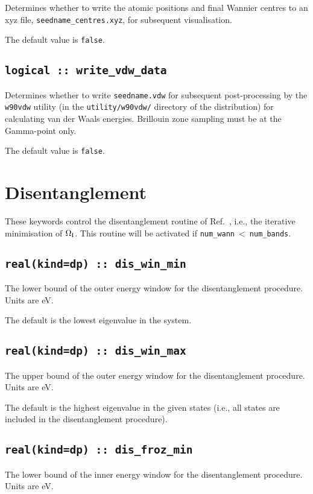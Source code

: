 Determines whether to write the atomic positions and
final Wannier centres to an xyz file,
\verb#seedname_centres.xyz#, for subsequent
visualisation.

The default value is \verb#false#.

\subsection[write\_vdw\_data]{\tt logical :: write\_vdw\_data}

Determines whether to write \verb#seedname.vdw# for
subsequent post-processing by the \verb#w90vdw# utility
(in the \verb#utility/w90vdw/# directory of the
distribution) for calculating van der Waals energies.
Brillouin zone sampling must be at the Gamma-point only.

The default value is \verb#false#.


\section{Disentanglement}
These keywords control the disentanglement routine of
Ref.~\cite{souza-prb01}, i.e., the iterative minimisation of $\Omega_{\mathrm{I}}$. This
routine will be activated if \verb#num_wann#$\:<\:$\verb#num_bands#.


\subsection[dis\_win\_min]{\tt real(kind=dp) :: dis\_win\_min}
The lower bound of the outer energy window for the disentanglement
procedure. Units are eV.

The default is the lowest eigenvalue in the system.

\subsection[dis\_win\_max]{\tt real(kind=dp) :: dis\_win\_max}
The upper bound of the outer energy window for the disentanglement
procedure. Units are eV.

The default is the highest eigenvalue in the given states (i.e., all states
are included in the disentanglement procedure).

\subsection[dis\_froz\_min]{\tt real(kind=dp) :: dis\_froz\_min}
The lower bound of the inner energy window for the disentanglement
procedure.  Units are eV.

